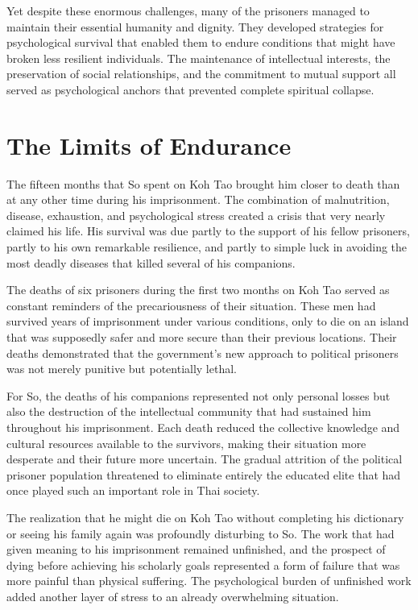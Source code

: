 \documentclass[
  Letterpaper,
]{scrbook}
\begin{document}
Yet despite these enormous challenges, many of the prisoners managed to
maintain their essential humanity and dignity. They developed strategies
for psychological survival that enabled them to endure conditions that
might have broken less resilient individuals. The maintenance of
intellectual interests, the preservation of social relationships, and
the commitment to mutual support all served as psychological anchors
that prevented complete spiritual collapse.

\section{The Limits of Endurance}\label{the-limits-of-endurance}

The fifteen months that So spent on Koh Tao brought him closer to death
than at any other time during his imprisonment. The combination of
malnutrition, disease, exhaustion, and psychological stress created a
crisis that very nearly claimed his life. His survival was due partly to
the support of his fellow prisoners, partly to his own remarkable
resilience, and partly to simple luck in avoiding the most deadly
diseases that killed several of his companions.

The deaths of six prisoners during the first two months on Koh Tao
served as constant reminders of the precariousness of their situation.
These men had survived years of imprisonment under various conditions,
only to die on an island that was supposedly safer and more secure than
their previous locations. Their deaths demonstrated that the
government's new approach to political prisoners was not merely punitive
but potentially lethal.

For So, the deaths of his companions represented not only personal
losses but also the destruction of the intellectual community that had
sustained him throughout his imprisonment. Each death reduced the
collective knowledge and cultural resources available to the survivors,
making their situation more desperate and their future more uncertain.
The gradual attrition of the political prisoner population threatened to
eliminate entirely the educated elite that had once played such an
important role in Thai society.

The realization that he might die on Koh Tao without completing his
dictionary or seeing his family again was profoundly disturbing to So.
The work that had given meaning to his imprisonment remained unfinished,
and the prospect of dying before achieving his scholarly goals
represented a form of failure that was more painful than physical
suffering. The psychological burden of unfinished work added another
layer of stress to an already overwhelming situation.
\end{document}
